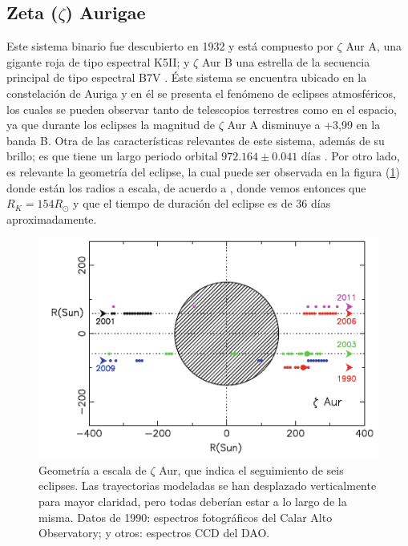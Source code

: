 \documentclass[12pt,oneside,openany,letter]{book}
\begin{document}
\subsection{Zeta ($\zeta$) Aurigae}

Este sistema binario fue descubierto en 1932 \citep{guthnick1934bevorstehende} y está compuesto por $\zeta$ Aur A, una gigante roja de tipo espectral K5II; y $\zeta$ Aur B una estrella de la secuencia principal de tipo espectral B7V \citep{shenavrin2011vizier}. Éste sistema se encuentra ubicado en la constelación de Auriga  y en él se presenta el fenómeno de eclipses atmosféricos, los cuales se pueden observar tanto de telescopios terrestres como en el espacio, ya que durante los eclipses la magnitud de $\zeta$ Aur A disminuye a +3,99 en la banda B. Otra de las características relevantes de este sistema, además de su brillo; es que tiene un largo periodo orbital $972.164 \pm 0.041$ días \citep{griffin2005spectroscopic}. Por otro lado, es relevante la geometría del eclipse, la cual puede ser observada en la figura (\ref{fig:geometria}) donde están los radios a escala, de acuerdo a \citep{di1990angular}, donde vemos entonces que $R_K = 154 R_\odot$ y que el tiempo de duración del eclipse es de 36 días aproximadamente.

\begin{figure}[h]
    \centering
    \includegraphics[width=0.6\linewidth]{Images/Geometria_eclipse.PNG}
    \caption{Geometría a escala de $\zeta$ Aur, que indica el seguimiento de seis eclipses. Las trayectorias modeladas se han desplazado verticalmente para mayor claridad, pero todas deberían estar a lo largo de la misma. Datos de 1990: espectros fotográficos del Calar Alto Observatory; y otros: espectros CCD del DAO.}
    \label{fig:geometria}
\end{figure}
\end{document}
